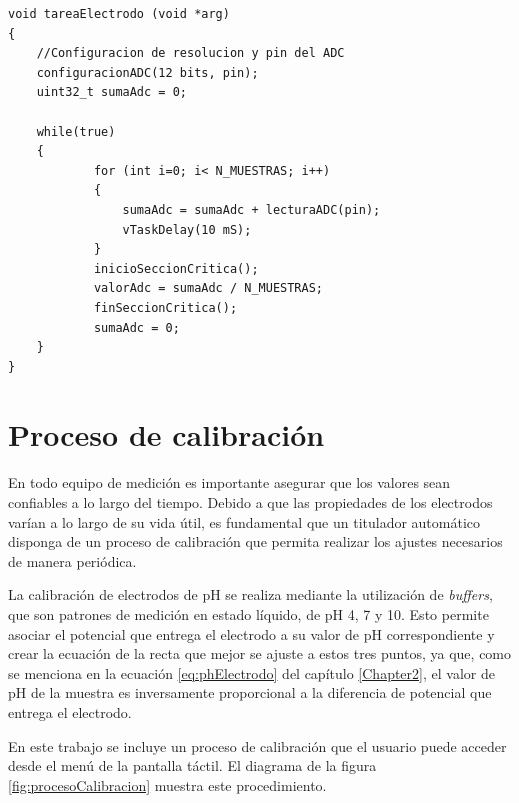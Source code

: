 \begin{lstlisting}[label=cod:tareaElectrodo,caption=Pseudocódigo de la tarea de medición de pH.]
void tareaElectrodo (void *arg)
{
    //Configuracion de resolucion y pin del ADC
    configuracionADC(12 bits, pin);
    uint32_t sumaAdc = 0;

    while(true)
    {
    		for (int i=0; i< N_MUESTRAS; i++)
    		{
        		sumaAdc = sumaAdc + lecturaADC(pin);  
        		vTaskDelay(10 mS);
    		} 
    		inicioSeccionCritica(); 
    		valorAdc = sumaAdc / N_MUESTRAS;
    		finSeccionCritica();
    		sumaAdc = 0;
    }
}
\end{lstlisting}

\section{Proceso de calibración}

En todo equipo de medición es importante asegurar que los valores sean confiables a lo largo del tiempo. Debido a que las propiedades de los electrodos varían a lo largo de su vida útil, es fundamental que un titulador automático disponga de un proceso de calibración que permita realizar los ajustes necesarios de manera periódica.

La calibración de electrodos de pH se realiza mediante la utilización de \textit{buffers}, que son patrones de medición en estado líquido, de pH 4, 7 y 10. Esto permite asociar el potencial que entrega el electrodo a su valor de pH correspondiente y crear la ecuación de la recta que mejor se ajuste a estos tres puntos, ya que, como se menciona en la ecuación \ref{eq:phElectrodo} del capítulo \ref{Chapter2}, el valor de pH de la muestra es inversamente proporcional a la diferencia de potencial que entrega el electrodo.

En este trabajo se incluye un proceso de calibración que el usuario puede acceder desde el menú de la pantalla táctil. El diagrama de la figura \ref{fig:procesoCalibracion} muestra este procedimiento. 

